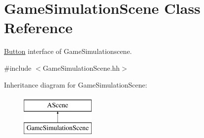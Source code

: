 \hypertarget{classGameSimulationScene}{}\section{Game\+Simulation\+Scene Class Reference}
\label{classGameSimulationScene}


\hyperlink{classButton}{Button} interface of Game\+Simulationscene.  




{\ttfamily \#include $<$Game\+Simulation\+Scene.\+hh$>$}

Inheritance diagram for Game\+Simulation\+Scene\+:\begin{figure}[H]
\begin{center}
\leavevmode
\includegraphics[height=2.000000cm]{classGameSimulationScene}
\end{center}
\end{figure}
